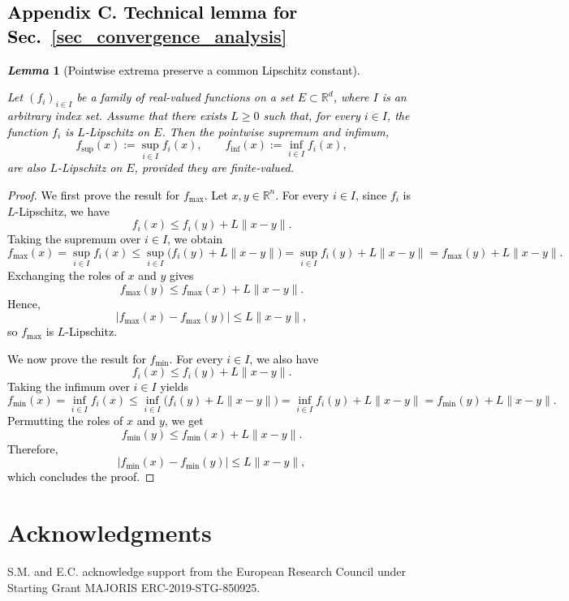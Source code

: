 \documentclass[review]{elsarticle}
\newcommand{\cblue}{\textcolor{black}}
\newtheorem{lemma}{\em Lemma}
\begin{document}
\cblue{
\section*{Appendix C. Technical lemma for Sec.~\ref{sec_convergence_analysis}}
\label{app:lemmas}
\begin{lemma}[Pointwise extrema preserve a common Lipschitz constant]
\label{lemm:max_min_lip_function}

Let $(f_i)_{i\in I}$ be a family of real-valued functions on a set $E\subset \mathbb{R}^d$, where $I$ is an arbitrary index set. Assume that there exists $L\geq 0$ such that, for every $i\in I$, the function $f_i$ is $L$-Lipschitz on $E$. Then the pointwise supremum and infimum,
$$
f_{\sup}(x):=\sup_{i\in I} f_i(x),
\qquad
f_{\inf}(x):=\inf_{i\in I} f_i(x),
$$
are also $L$-Lipschitz on $E$, provided they are finite-valued.
\end{lemma}

\begin{proof}
We first prove the result for $f_{\max}$. Let $x,y\in\mathbb{R}^n$. For every $i\in I$, since $f_i$ is $L$-Lipschitz, we have
\begin{equation*}
f_i(x)\leq f_i(y)+L\|x-y\|.
\end{equation*}
Taking the supremum over $i\in I$, we obtain
\begin{equation*}
f_{\max}(x)
=\sup_{i\in I} f_i(x)
\leq \sup_{i\in I}\bigl(f_i(y)+L\|x-y\|\bigr)
= \sup_{i\in I} f_i(y)+L\|x-y\|
= f_{\max}(y)+L\|x-y\|.
\end{equation*}
Exchanging the roles of $x$ and $y$ gives
\begin{equation*}
f_{\max}(y)\leq f_{\max}(x)+L\|x-y\|.
\end{equation*}
Hence,
\begin{equation*}
|f_{\max}(x)-f_{\max}(y)|\leq L\|x-y\|,
\end{equation*}
so $f_{\max}$ is $L$-Lipschitz.

We now prove the result for $f_{\min}$. For every $i\in I$, we also have
\begin{equation*}
f_i(x)\leq f_i(y)+L\|x-y\|.
\end{equation*}
Taking the infimum over $i\in I$ yields
\begin{equation*}
f_{\min}(x)
=\inf_{i\in I} f_i(x)
\leq \inf_{i\in I}\bigl(f_i(y)+L\|x-y\|\bigr)
= \inf_{i\in I} f_i(y)+L\|x-y\|
= f_{\min}(y)+L\|x-y\|.
\end{equation*}
Permutting the roles of $x$ and $y$, we get
\begin{equation*}
f_{\min}(y)\leq f_{\min}(x)+L\|x-y\|.
\end{equation*}
Therefore,
\begin{equation*}
|f_{\min}(x)-f_{\min}(y)|\leq L\|x-y\|,
\end{equation*}
which concludes the proof.
\end{proof}
}

\section*{Acknowledgments}

S.M. and E.C. acknowledge support from the European Research Council
under Starting Grant MAJORIS ERC-2019-STG-850925.


\end{document}
